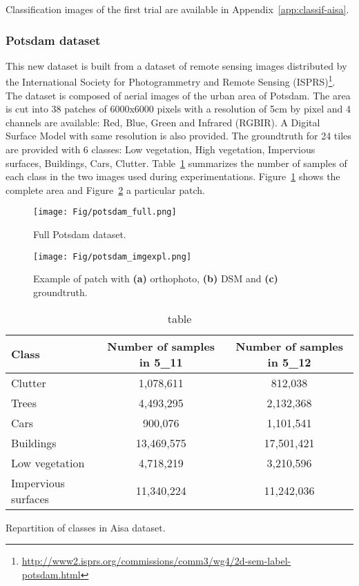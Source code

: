 \documentclass[a4paper,11pt,DIV=16,abstracton]{scrartcl}
\begin{document}
        Classification images of the first trial are available in Appendix~\ref{app:classif-aisa}.

        \subsubsection{Potsdam dataset}

        This new dataset is built from a dataset of remote sensing images distributed by the International Society for Photogrammetry and Remote Sensing (ISPRS)\footnote{\url{http://www2.isprs.org/commissions/comm3/wg4/2d-sem-label-potsdam.html}}. The dataset is composed of aerial images of the urban area of Potsdam. The area is cut into 38 patches of 6000x6000 pixels with a resolution of 5cm by pixel and 4 channels are available: Red, Blue, Green and Infrared (RGBIR). A Digital Surface Model with same resolution is also provided. The groundtruth for 24 tiles are provided with 6 classes: Low vegetation, High vegetation, Impervious surfaces, Buildings, Cars, Clutter. Table~\ref{tab:potsdam} summarizes the number of samples of each class in the two images used during experimentations. Figure~\ref{fig:potsdam-dataset} shows the complete area and Figure~\ref{fig:potsdam-expl} a particular patch.

        \begin{figure}[!ht]
            \centering
            \texttt{[image: Fig/potsdam\_full.png]}
            \caption{Full Potsdam dataset.\label{fig:potsdam-dataset}}
        \end{figure}

        \begin{figure}[!ht]
            \centering
            \texttt{[image: Fig/potsdam\_imgexpl.png]}
            \caption{Example of patch with {\bfseries{(a)}} orthophoto, {\bfseries{(b)}} DSM and {\bfseries{(c)}} groundtruth.\label{fig:potsdam-expl}}
        \end{figure}

        \begin{table}[!ht]
            \centering
            \begin{tabular}[b]{lcc}\hline
              Class & Number of samples in 5\_11 & Number of samples in 5\_12 \\
              \hline
              Clutter             & 1,078,611  & 812,038 \\
              Trees               & 4,493,295  & 2,132,368 \\
              Cars                & 900,076    & 1,101,541 \\
              Buildings           & 13,469,575 & 17,501,421 \\
              Low vegetation      & 4,718,219  & 3,210,596 \\
              Impervious surfaces & 11,340,224 & 11,242,036 \\
              \hline
            \end{tabular}
            \caption{table}{Repartition of classes in Aisa dataset.\label{tab:potsdam}}
        \end{table}
\end{document}
